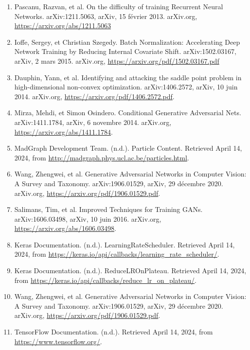 \documentclass [12pt] {article}
\numberwithin{equation}{section} %
\numberwithin{figure}{section}   %
\begin{document}
\begin{enumerate}
    \item Pascanu, Razvan, et al. On the difficulty of training Recurrent Neural Networks. arXiv:1211.5063, arXiv, 15 février 2013. arXiv.org, \url{https://arxiv.org/abs/1211.5063} \label{clipping}
    \item Ioffe, Sergey, et Christian Szegedy. Batch Normalization: Accelerating Deep Network Training by Reducing Internal Covariate Shift. arXiv:1502.03167, arXiv, 2 mars 2015. arXiv.org, \url{https://arxiv.org/pdf/1502.03167.pdf} \label{batch norm}
    \item Dauphin, Yann, et al. Identifying and attacking the saddle point problem in high-dimensional non-convex optimization. arXiv:1406.2572, arXiv, 10 juin 2014. arXiv.org, \url{https://arxiv.org/pdf/1406.2572.pdf}. \label{saddle}
    \item Mirza, Mehdi, et Simon Osindero. Conditional Generative Adversarial Nets. arXiv:1411.1784, arXiv, 6 novembre 2014. arXiv.org, \url{https://arxiv.org/abs/1411.1784}. \label{cGAN}
    \item MadGraph Development Team. (n.d.). Particle Content. Retrieved April 14, 2024, from \url{http://madgraph.phys.ucl.ac.be/particles.html}.\label{MadGraph}
    \item Wang, Zhengwei, et al. Generative Adversarial Networks in Computer Vision: A Survey and Taxonomy. arXiv:1906.01529, arXiv, 29 décembre 2020. arXiv.org, \url{https://arxiv.org/pdf/1906.01529.pdf}. \label{hard to train}
    \item Salimans, Tim, et al. Improved Techniques for Training GANs. arXiv:1606.03498, arXiv, 10 juin 2016. arXiv.org, \url{https://arxiv.org/abs/1606.03498}. \label{OpenAI}
    \item Keras Documentation. (n.d.). LearningRateScheduler. Retrieved April 14, 2024, from \url{https://keras.io/api/callbacks/learning_rate_scheduler/}. \label{LR_S}
    \item Keras Documentation. (n.d.). ReduceLROnPlateau. Retrieved April 14, 2024, from \url{https://keras.io/api/callbacks/reduce_lr_on_plateau/}.\label{reduce_lr}
    \item Wang, Zhengwei, et al. Generative Adversarial Networks in Computer Vision: A Survey and Taxonomy. arXiv:1906.01529, arXiv, 29 décembre 2020. arXiv.org, \url{https://arxiv.org/pdf/1906.01529.pdf}. \label{list_GAN}
    \item TensorFlow Documentation. (n.d.). Retrieved April 14, 2024, from \url{https://www.tensorflow.org/}. \label{tf}

\end{enumerate}
\end{document}
